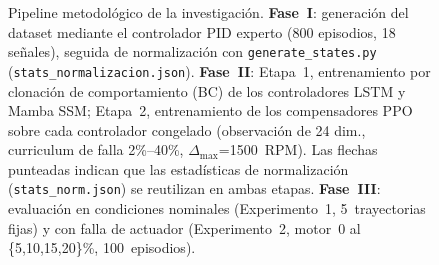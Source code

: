\begin{figure}[htbp]
\caption{Pipeline metodológico de la investigación. \textbf{Fase~I}: generación
del dataset mediante el controlador PID experto (800 episodios, 18 señales),
seguida de normalización con \texttt{generate\_states.py}
(\texttt{stats\_normalizacion.json}). \textbf{Fase~II}: Etapa~1, entrenamiento
por clonación de comportamiento (BC) de los controladores LSTM y Mamba SSM;
Etapa~2, entrenamiento de los compensadores PPO sobre cada controlador
congelado (observación de 24 dim., curriculum de falla 2\%--40\%,
$\Delta_{\max}$=1500~RPM). Las flechas punteadas indican que las estadísticas
de normalización (\texttt{stats\_norm.json}) se reutilizan en ambas etapas.
\textbf{Fase~III}: evaluación en condiciones nominales
(Experimento~1, 5~trayectorias fijas) y con falla de actuador
(Experimento~2, motor~0 al \{5,10,15,20\}\%, 100~episodios).}
\label{fig:pipeline}
\end{figure}
